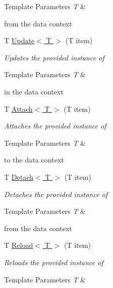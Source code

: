 \begin{DoxyCompactItemize}
\begin{DoxyCompactList}
\begin{DoxyTemplParams}{Template Parameters}
{\em T} & \\
\hline
\end{DoxyTemplParams}
from the data context \end{DoxyCompactList}\item 
T \hyperlink{class_highway_1_1_data_1_1_entity_framework_1_1_contexts_1_1_entity_framework_context_a3746422e9f70039d208c6dd6be02327e}{Update$<$ T $>$} (T item)
\begin{DoxyCompactList}\small\item\em Updates the provided instance of 
\begin{DoxyTemplParams}{Template Parameters}
{\em T} & \\
\hline
\end{DoxyTemplParams}
in the data context \end{DoxyCompactList}\item 
T \hyperlink{class_highway_1_1_data_1_1_entity_framework_1_1_contexts_1_1_entity_framework_context_ae482a535469bb401c655d1581a4f34a6}{Attach$<$ T $>$} (T item)
\begin{DoxyCompactList}\small\item\em Attaches the provided instance of 
\begin{DoxyTemplParams}{Template Parameters}
{\em T} & \\
\hline
\end{DoxyTemplParams}
to the data context \end{DoxyCompactList}\item 
T \hyperlink{class_highway_1_1_data_1_1_entity_framework_1_1_contexts_1_1_entity_framework_context_aa0ccdc09ac449783a450a6098946a289}{Detach$<$ T $>$} (T item)
\begin{DoxyCompactList}\small\item\em Detaches the provided instance of 
\begin{DoxyTemplParams}{Template Parameters}
{\em T} & \\
\hline
\end{DoxyTemplParams}
from the data context \end{DoxyCompactList}\item 
T \hyperlink{class_highway_1_1_data_1_1_entity_framework_1_1_contexts_1_1_entity_framework_context_a5a2499b1327d56166ff950578d62d615}{Reload$<$ T $>$} (T item)
\begin{DoxyCompactList}\small\item\em Reloads the provided instance of 
\begin{DoxyTemplParams}{Template Parameters}
{\em T} & \\

\end{DoxyTemplParams}
\end{DoxyCompactList}
\end{DoxyCompactItemize}
